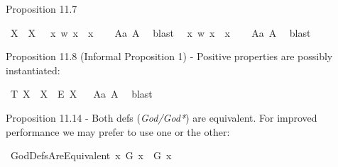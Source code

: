 \begin{isabellebody}
\begin{isamarkuptext}
Proposition 11.7%
\end{isamarkuptext}\isamarkuptrue%
\isamarkupfalse%
\ {\isachardoublequoteopen}{\isasymlfloor}{\isacharparenleft}\isactrlbold {\isasymexists}X{\isachardot}\ {\isasymP}\ X{\isacharparenright}\ \isactrlbold {\isasymrightarrow}\ \isactrlbold {\isasymnot}{\isasymP}\ {\isacharparenleft}{\isacharparenleft}{\isasymlambda}x\ w{\isachardot}\ {\isasymnot}x\ {\isacharequal}\ x{\isacharparenright}{\isacharparenright}{\isasymrfloor}{\isachardoublequoteclose}%
\isadelimproof
\ \ %
\endisadelimproof
%
\isatagproof
{}\isamarkupfalse%
\ A{}a\ A{}\ \isamarkupfalse%
\ blast%
\endisatagproof
{\isafoldproof}%
%
\isadelimproof
%
\endisadelimproof
\isanewline
{}\isamarkupfalse%
\ {\isachardoublequoteopen}{\isasymlfloor}\isactrlbold {\isasymnot}{\isasymP}\ {\isacharparenleft}{\isasymlambda}x\ w{\isachardot}\ {\isasymnot}x\ {\isacharequal}\ x{\isacharparenright}{\isasymrfloor}{\isachardoublequoteclose}%
\isadelimproof
\ \ %
\endisadelimproof
%
\isatagproof
{}\isamarkupfalse%
\ A{}a\ A{}\ \isamarkupfalse%
\ blast%
\endisatagproof
{\isafoldproof}%
%
\isadelimproof
%
\endisadelimproof
%
\begin{isamarkuptext}%
Proposition 11.8 (Informal Proposition 1) - Positive properties are possibly instantiated:%
\end{isamarkuptext}\isamarkuptrue%
\isamarkupfalse%
\ T{}{\isacharcolon}\ {\isachardoublequoteopen}{\isasymlfloor}\isactrlbold {\isasymforall}X{\isachardot}\ {\isasymP}\ X\ \isactrlbold {\isasymrightarrow}\ \isactrlbold {\isasymdiamond}\isactrlbold {\isasymexists}\isactrlsup E\ X{\isasymrfloor}{\isachardoublequoteclose}%
\isadelimproof
\ %
\endisadelimproof
%
\isatagproof
{}\isamarkupfalse%
\ A{}a\ A{}\ \isamarkupfalse%
\ blast%
\endisatagproof
{\isafoldproof}%
%
\isadelimproof
%
\endisadelimproof
%
\begin{isamarkuptext}%
Proposition 11.14 - Both defs (\emph{God/God*}) are equivalent. For improved performance we may prefer to use one or the other:%
\end{isamarkuptext}\isamarkuptrue%
\isamarkupfalse%
\ GodDefsAreEquivalent{\isacharcolon}\ {\isachardoublequoteopen}{\isasymlfloor}\isactrlbold {\isasymforall}x{\isachardot}\ G\ x\ \isactrlbold {\isasymleftrightarrow}\ G{\isacharasterisk}\ x{\isasymrfloor}{\isachardoublequoteclose}%
\isadelimproof

\end{isabellebody}
